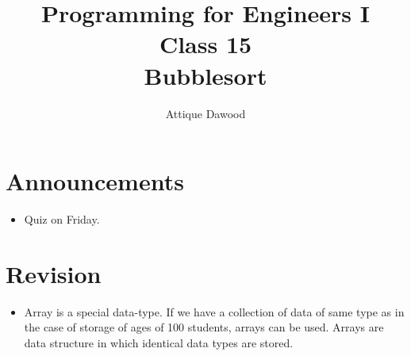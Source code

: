 \documentclass[12pt,a4paper]{article}
\title{\vspace{-2cm}Programming for Engineers I\\Class 15\\Bubblesort}
\author{Attique Dawood}
\begin{document}
\maketitle
\section{Announcements}
\begin{itemize}
\item Quiz on Friday.
\end{itemize}
\section{Revision}
\begin{itemize}
\item Array is a special data-type. If we have a collection of data of same type as in the case of storage of ages of 100 students, arrays can be used. Arrays are data structure in which identical data types are stored.
\end{itemize}
\end{document}
